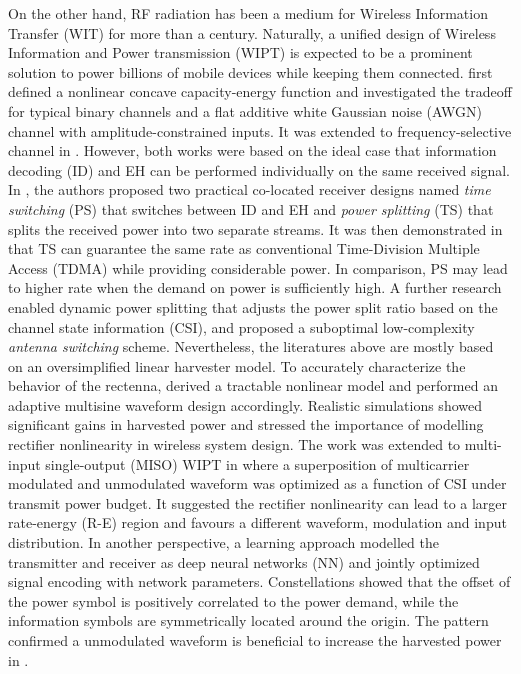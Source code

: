 On the other hand, RF radiation has been a medium for Wireless Information Transfer (WIT) for more than a century. Naturally, a unified design of Wireless Information and Power transmission (WIPT) is expected to be a prominent solution to power billions of mobile devices while keeping them connected. \cite{R.Varshney2008} first defined a nonlinear concave capacity-energy function and investigated the tradeoff for typical binary channels and a flat additive white Gaussian noise (AWGN) channel with amplitude-constrained inputs. It was extended to frequency-selective channel in \cite{Grover2010}. However, both works were based on the ideal case that information decoding (ID) and EH can be performed individually on the same received signal. In \cite{Zhang2013}, the authors proposed two practical co-located receiver designs named \textit{time switching} (PS) that switches between ID and EH and \textit{power splitting} (TS) that splits the received power into two separate streams. It was then demonstrated in \cite{Zhou2013a} that TS can guarantee the same rate as conventional Time-Division Multiple Access (TDMA) while providing considerable power. In comparison, PS may lead to higher rate when the demand on power is sufficiently high. A further research \cite{Liu2013} enabled dynamic power splitting that adjusts the power split ratio based on the channel state information (CSI), and proposed a suboptimal low-complexity \textit{antenna switching} scheme. Nevertheless, the literatures above are mostly based on an oversimplified linear harvester model. To accurately characterize the behavior of the rectenna, \cite{Clerckx2016} derived a tractable nonlinear model and performed an adaptive multisine waveform design accordingly. Realistic simulations showed significant gains in harvested power and stressed the importance of modelling rectifier nonlinearity in wireless system design. The work was extended to multi-input single-output (MISO) WIPT in \cite{Clerckx2018} where a superposition of multicarrier modulated and unmodulated waveform was optimized as a function of CSI under transmit power budget. It suggested the rectifier nonlinearity can lead to a larger rate-energy (R-E) region and favours a different waveform, modulation and input distribution. In another perspective, a learning approach \cite{Varasteh2018} modelled the transmitter and receiver as deep neural networks (NN) and jointly optimized signal encoding with network parameters. Constellations showed that the offset of the power symbol is positively correlated to the power demand, while the information symbols are symmetrically located around the origin. The pattern confirmed a unmodulated waveform is beneficial to increase the harvested power in \cite{Clerckx2018}.
